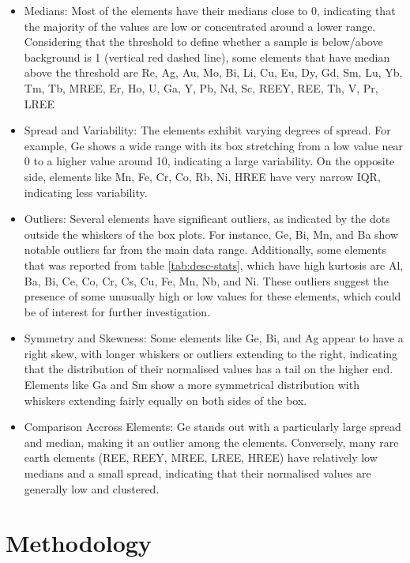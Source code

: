 \documentclass[11pt,a4paper,]{article}
\providecommand{\tightlist}{%
  \setlength{\itemsep}{0pt}\setlength{\parskip}{0pt}}
\begin{document}
\begin{itemize}
\tightlist
\item
  Medians: Most of the elements have their medians close to 0, indicating that the majority of the values are low or concentrated around a lower range. Considering that the threshold to define whether a sample is below/above background is 1 (vertical red dashed line), some elements that have median above the threshold are Re, Ag, Au, Mo, Bi, Li, Cu, Eu, Dy, Gd, Sm, Lu, Yb, Tm, Tb, MREE, Er, Ho, U, Ga, Y, Pb, Nd, Sc, REEY, REE, Th, V, Pr, LREE
\item
  Spread and Variability: The elements exhibit varying degrees of spread. For example, Ge shows a wide range with its box stretching from a low value near 0 to a higher value around 10, indicating a large variability. On the opposite side, elements like Mn, Fe, Cr, Co, Rb, Ni, HREE have very narrow IQR, indicating less variability.
\item
  Outliers: Several elements have significant outliers, as indicated by the dots outside the whiskers of the box plots. For instance, Ge, Bi, Mn, and Ba show notable outliers far from the main data range. Additionally, some elements that was reported from table \ref{tab:desc-stats}, which have high kurtosis are Al, Ba, Bi, Ce, Co, Cr, Cs, Cu, Fe, Mn, Nb, and Ni. These outliers suggest the presence of some unusually high or low values for these elements, which could be of interest for further investigation.
\item
  Symmetry and Skewness: Some elements like Ge, Bi, and Ag appear to have a right skew, with longer whiskers or outliers extending to the right, indicating that the distribution of their normalised values has a tail on the higher end. Elements like Ga and Sm show a more symmetrical distribution with whiskers extending fairly equally on both sides of the box.
\item
  Comparison Accross Elements: Ge stands out with a particularly large spread and median, making it an outlier among the elements. Conversely, many rare earth elements (REE, REEY, MREE, LREE, HREE) have relatively low medians and a small spread, indicating that their normalised values are generally low and clustered.
\end{itemize}

\section{Methodology}\label{methodology}
\end{document}

